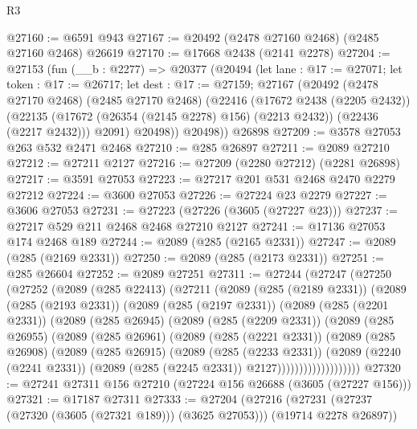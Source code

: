 \begin{lexlean}{R3}
\begin{coremodule}
@27160 := @6591 @943
@27167 := @20492 (@2478 @27160 @2468) (@2485 @27160 @2468) @26619
@27170 := @17668 @2438 (@2141 @2278)
@27204 := @27153
    (fun (__b : @2277) =>
    @20377
      (@20494
        (let lane : @17 := @27071;
        let token : @17 := @26717;
        let dest : @17 := @27159;
        @27167
          (@20492
            (@2478 @27170 @2468)
            (@2485 @27170 @2468)
            (@22416
              (@17672 @2438 (@2205 @2432))
              (@22135 (@17672 (@26354 (@2145 @2278) @156) (@2213 @2432)) (@22436 (@2217 @2432)))
              @2091)
            @20498))
        @20498))
    @26898
@27209 := @3578 @27053 @263 @532 @2471 @2468
@27210 := @285 @26897
@27211 := @2089 @27210
@27212 := @27211 @2127
@27216 := @27209 (@2280 @27212) (@2281 @26898)
@27217 := @3591 @27053
@27223 := @27217 @201 @531 @2468 @2470 @2279 @27212
@27224 := @3600 @27053
@27226 := @27224 @23 @2279
@27227 := @3606 @27053
@27231 := @27223 (@27226 (@3605 (@27227 @23)))
@27237 := @27217 @529 @211 @2468 @2468 @27210 @2127
@27241 := @17136 @27053 @174 @2468 @189
@27244 := @2089 (@285 (@2165 @2331))
@27247 := @2089 (@285 (@2169 @2331))
@27250 := @2089 (@285 (@2173 @2331))
@27251 := @285 @26604
@27252 := @2089 @27251
@27311 := @27244
    (@27247
      (@27250
        (@27252
          (@2089
            (@285 @22413)
            (@27211
              (@2089
                (@285 (@2189 @2331))
                (@2089
                  (@285 (@2193 @2331))
                  (@2089
                    (@285 (@2197 @2331))
                    (@2089
                      (@285 (@2201 @2331))
                      (@2089
                        (@285 @26945)
                        (@2089
                          (@285 (@2209 @2331))
                          (@2089
                            (@285 @26955)
                            (@2089
                              (@285 @26961)
                              (@2089
                                (@285 (@2221 @2331))
                                (@2089
                                  (@285 @26908)
                                  (@2089
                                    (@285 @26915)
                                    (@2089
                                      (@285 (@2233 @2331))
                                      (@2089
                                        (@2240 (@2241 @2331))
                                        (@2089 (@285 (@2245 @2331)) @2127)))))))))))))))))))
@27320 := @27241 @27311 @156 @27210 (@27224 @156 @26688 (@3605 (@27227 @156)))
@27321 := @17187 @27311
@27333 := @27204
    (@27216 (@27231 (@27237 (@27320 (@3605 (@27321 @189))) (@3625 @27053))) (@19714 @2278 @26897))

\end{coremodule}
\end{lexlean}

